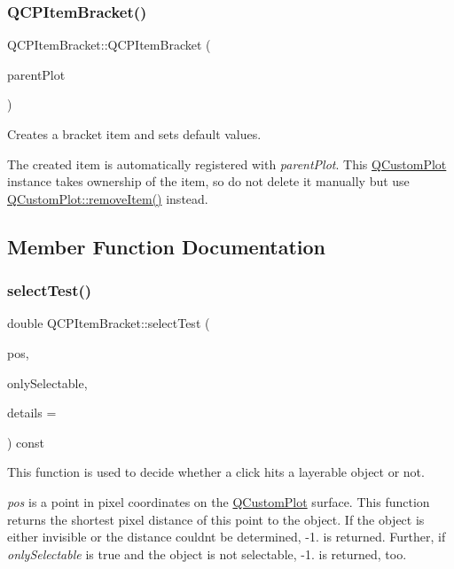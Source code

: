 \subsubsection{\texorpdfstring{Q\+C\+P\+Item\+Bracket()}{QCPItemBracket()}}
{\footnotesize\ttfamily Q\+C\+P\+Item\+Bracket\+::\+Q\+C\+P\+Item\+Bracket (\begin{DoxyParamCaption}\item[{\hyperlink{class_q_custom_plot}{Q\+Custom\+Plot} $\ast$}]{parent\+Plot }\end{DoxyParamCaption})\hspace{0.3cm}{\ttfamily [explicit]}}

Creates a bracket item and sets default values.

The created item is automatically registered with {\itshape parent\+Plot}. This \hyperlink{class_q_custom_plot}{Q\+Custom\+Plot} instance takes ownership of the item, so do not delete it manually but use \hyperlink{class_q_custom_plot_ae04446557292551e8fb6e2c106e1848d}{Q\+Custom\+Plot\+::remove\+Item()} instead. 

\subsection{Member Function Documentation}
\mbox{\label{class_q_c_p_item_bracket_a49a6b2f41e0a8c2a2e3a2836027a8455}} 
\subsubsection{\texorpdfstring{select\+Test()}{selectTest()}}
{\footnotesize\ttfamily double Q\+C\+P\+Item\+Bracket\+::select\+Test (\begin{DoxyParamCaption}\item[{const Q\+PointF \&}]{pos,  }\item[{bool}]{only\+Selectable,  }\item[{Q\+Variant $\ast$}]{details = {} }\end{DoxyParamCaption}) const\hspace{0.3cm}{\ttfamily [virtual]}}

This function is used to decide whether a click hits a layerable object or not.

{\itshape pos} is a point in pixel coordinates on the \hyperlink{class_q_custom_plot}{Q\+Custom\+Plot} surface. This function returns the shortest pixel distance of this point to the object. If the object is either invisible or the distance couldn\textquotesingle{}t be determined, -\/1. is returned. Further, if {\itshape only\+Selectable} is true and the object is not selectable, -\/1. is returned, too.

